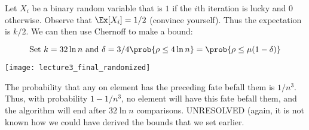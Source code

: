 \documentclass[../main.tex]{subfiles}
\begin{document}
\begin{example}
    Let $X_{i}$ be a binary random variable that is $1$ if the $i$th iteration is lucky and $0$ otherwise. Observe that
    $\Ex[X_{i}] = 1/2$ (convince yourself). Thus the expectation is $k/2$. We can then use Chernoff to make a bound:

    \[
        \text{Set $k = 32 \ln n$ and $\delta = 3/4$} \\
        \prob{\rho \leq 4\ln n} = \prob{\rho \leq \mu(1 - \delta)} \\
    \]


    \begin{center}
        \texttt{[image: lecture3\_final\_randomized]}
    \end{center}

    The probability that any on element has the preceding fate befall them is $1/n^3$. Thus, with probability $1 - 1/n^3$, no element will have this fate befall them, and the algorithm will end after $32 \ln n$ comparisons. UNRESOLVED (again, it is not known how we could have derived the bounds that we set earlier.
\end{example}
\end{document}
